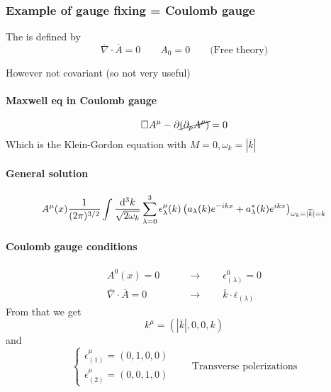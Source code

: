 \subsubsection{Example of gauge fixing = Coulomb gauge}
\begin{definition}
The  is defined by
\[ \overline{\nabla}\cdot\overline{A} = 0 \qquad A_0 = 0 \qquad \text{(Free theory)} \]
\end{definition}
However not covariant (so not very useful)
\paragraph{Maxwell eq in Coulomb gauge}
\[ \Box A^\mu - \partial \cancel{\left(\partial_\rho A^\rho\right)} = 0 \]
Which is the Klein-Gordon equation with $M=0, \omega_k = |\overline{k}|$
\paragraph{General solution}
\[ A^\mu(x) \frac{1}{(2\pi)^{3/2}}\int \frac{\operatorname{d \!}{^3k}}{\sqrt{2\omega_k}}\sum^3_{\lambda=0}\epsilon_\lambda^\mu(k)\left(a_\lambda(k)e^{-ikx}+a^*_\lambda(k)e^{ikx}\right)_{\omega_k=|\overline{k}|=k} \]
\paragraph{Coulomb gauge conditions}
\begin{align*}
A^0(x) = 0 \qquad &\to \qquad \epsilon^0_{(\lambda)} = 0\\
\overline{\nabla}\cdot\overline{A} = 0 \qquad &\to \qquad \overline{k}\cdot \overline{\epsilon}_{(\lambda)}
\end{align*}
From that we get
\[ k^\mu = (|\overline{k}|,0,0,k) \]
and
\[ \begin{cases}
\epsilon^\mu_{(1)} = (0,1,0,0) \\ \epsilon^\mu_{(2)} = (0,0,1,0)
\end{cases} \qquad \text{Transverse polerizations} \]

